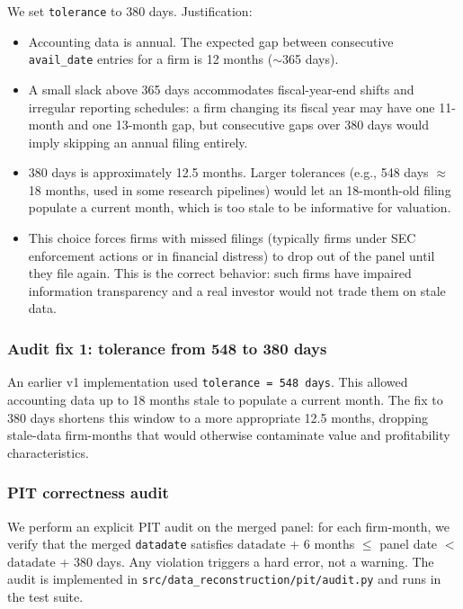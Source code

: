 We set \texttt{tolerance} to 380 days. Justification:

\begin{itemize}
\item Accounting data is annual. The expected gap between consecutive
      \texttt{avail\_date} entries for a firm is 12 months
      (\(\sim\)365 days).
\item A small slack above 365 days accommodates fiscal-year-end shifts
      and irregular reporting schedules: a firm changing its fiscal
      year may have one 11-month and one 13-month gap, but consecutive
      gaps over 380 days would imply skipping an annual filing entirely.
\item 380 days is approximately 12.5 months. Larger tolerances
      (e.g., 548 days $\approx$ 18 months, used in some research
      pipelines) would let an 18-month-old filing populate a current
      month, which is too stale to be informative for valuation.
\item This choice forces firms with missed filings (typically firms
      under SEC enforcement actions or in financial distress) to drop
      out of the panel until they file again. This is the correct
      behavior: such firms have impaired information transparency and
      a real investor would not trade them on stale data.
\end{itemize}

\subsubsection{Audit fix 1: tolerance from 548 to 380 days}

An earlier v1 implementation used \texttt{tolerance = 548 days}. This
allowed accounting data up to 18 months stale to populate a current
month. The fix to 380 days shortens this window to a more appropriate
12.5 months, dropping stale-data firm-months that would otherwise
contaminate value and profitability characteristics.

\subsubsection{PIT correctness audit}

We perform an explicit PIT audit on the merged panel: for each
firm-month, we verify that the merged \texttt{datadate} satisfies
\(\mathrm{datadate}\) + 6 months
$\le$ panel date $<$
\(\mathrm{datadate}\) + 380 days. Any violation triggers a hard error,
not a warning. The audit is implemented in
\texttt{src/data\_reconstruction/pit/audit.py} and runs in the test
suite.

